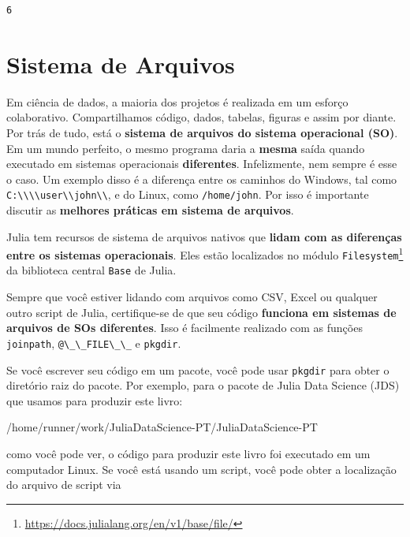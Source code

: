 \documentclass[
  notoc %
]{tufte-book}
\DeclareRobustCommand{\href}[2]{#2\footnote{\url{#1}}}
\newcommand{\passthrough}[1]{#1}
\begin{document}
\begin{lstlisting}[language=Output]
6
\end{lstlisting}

\hypertarget{sec:filesystem}{%
\section{Sistema de Arquivos}\label{sec:filesystem}}

Em ciência de dados, a maioria dos projetos é realizada em um esforço
colaborativo. Compartilhamos código, dados, tabelas, figuras e assim por
diante. Por trás de tudo, está o \textbf{sistema de arquivos do sistema
operacional (SO)}. Em um mundo perfeito, o mesmo programa daria a
\textbf{mesma} saída quando executado em sistemas operacionais
\textbf{diferentes}. Infelizmente, nem sempre é esse o caso. Um exemplo
disso é a diferença entre os caminhos do Windows, tal como
\passthrough{\lstinline!C:\\\\user\\john\\!}, e do Linux, como
\passthrough{\lstinline!/home/john!}. Por isso é importante discutir as
\textbf{melhores práticas em sistema de arquivos}.

Julia tem recursos de sistema de arquivos nativos que \textbf{lidam com
as diferenças entre os sistemas operacionais}. Eles estão localizados no
módulo
\href{https://docs.julialang.org/en/v1/base/file/}{\passthrough{\lstinline!Filesystem!}}
da biblioteca central \passthrough{\lstinline!Base!} de Julia.

Sempre que você estiver lidando com arquivos como CSV, Excel ou qualquer
outro script de Julia, certifique-se de que seu código \textbf{funciona
em sistemas de arquivos de SOs diferentes}. Isso é facilmente realizado
com as funções \passthrough{\lstinline!joinpath!},
\passthrough{\lstinline!@\_\_FILE\_\_!} e
\passthrough{\lstinline!pkgdir!}.

Se você escrever seu código em um pacote, você pode usar
\passthrough{\lstinline!pkgdir!} para obter o diretório raiz do pacote.
Por exemplo, para o pacote de Julia Data Science (JDS) que usamos para
produzir este livro:

/home/runner/work/JuliaDataScience-PT/JuliaDataScience-PT

como você pode ver, o código para produzir este livro foi executado em
um computador Linux. Se você está usando um script, você pode obter a
localização do arquivo de script via
\end{document}
